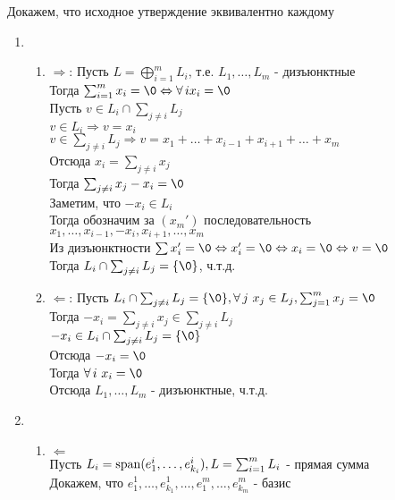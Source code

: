 \documentclass[12pt]{article}
\begin{document}
Докажем, что исходное утверждение эквивалентно каждому
\begin{enumerate}
    \item 
    \begin{enumerate}
        \item $\Rightarrow$:
        Пусть $L=\bigoplus_{i=1}^m L_i$, т.е. $L_1,\ldots,L_m$ - дизъюнктные\\
        Тогда $\sum_{i=1}^m x_i = \0 \Leftrightarrow \forall\,i x_i = \0$\\
        Пусть $v \in L_i \cap \sum_{j\neq i} L_j$\\
        $v \in L_i \Rightarrow v = x_i$\\
        $v \in \sum_{j\neq i} L_j \Rightarrow v = x_1+\ldots+x_{i-1} + x_{i+1} + \ldots + x_m$\\
        Отсюда $x_i = \sum_{j\neq i} x_j$\\
        Тогда $\sum_{j\neq i} x_j - x_i = \0$\\
        Заметим, что $-x_i \in L_i$\\
        Тогда обозначим за $(x_m')$ последовательность $x_1,\ldots,x_{i-1},-x_i,x_{i+1},\ldots,x_m$\\
        Из дизъюнктности $\sum x_i' = \0 \Leftrightarrow x_i'=\0 \Leftrightarrow x_i = \0 \Leftrightarrow v = \0$\\
        Тогда $L_i \cap \sum_{j \neq i} L_j = \{\0\}$, ч.т.д.
        \item $\Leftarrow$:
        Пусть $L_i \cap \sum_{j \neq i} L_j = \{\0\}, \forall\,j\ x_j \in L_j, \sum_{j=1}^m x_j = \0$\\
        Тогда $-x_i = \sum_{j \neq i}x_j \in \sum_{j \neq i}L_j$\\
        $-x_i \in L_i \cap \sum_{j \neq i}L_j = \{\0\}$\\
        Отсюда $-x_i = \0$\\
        Тогда $\forall\,i\ x_i = \0$\\
        Отсюда $L_1,\ldots,L_m$ - дизъюнктные, ч.т.д.
    \end{enumerate}
    \item
    \begin{enumerate}
        \item $\Leftarrow$\\
        Пусть $L_i = \operatorname{span}(e_1^i, \ldots, e_{k_i}^i), L=\sum_{i=1}^m L_i$ - прямая сумма\\
        Докажем, что $e_1^1, \ldots, e_{k_1}^1, \ldots, e_1^m, \ldots, e_{k_m}^m$ - базис\\

\end{enumerate}
\end{enumerate}
\end{document}
